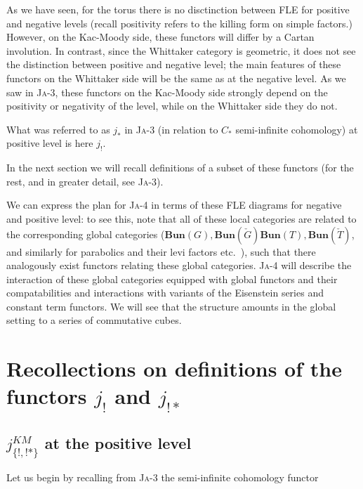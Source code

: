 \documentclass[12pt]{amsart}
\newcommand\Ja[1]{\textsc{Ja}-#1}
\newcommand\Bun{\mathbf{Bun}}
\begin{document}
  As we have seen, for the torus there is no disctinction between FLE for
  positive and negative levels (recall positivity refers to the killing form on
  simple factors.) However, on the Kac-Moody side, these functors will differ by
  a Cartan involution. In contrast, since the Whittaker category is geometric,
  it does not see the distinction between positive and negative level; the main
  features of these functors on the Whittaker side will be the same as at the
  negative level. As we saw in \Ja{3}, these functors on the Kac-Moody
  side strongly depend on the positivity or negativity of the level, while on
  the Whittaker side they do not.\\

  \begin{rmk}
    What was referred to as $j_*$ in \Ja{3} (in relation to $C_*$ semi-infinite
    cohomology) at positive level is here $j_!$.
  \end{rmk}

  In the next section we will recall definitions of a subset of these functors
  (for the rest, and in greater detail, see \Ja{3}).

  \begin{rmk}
    We can express the plan for \Ja{4} in terms of these FLE diagrams for
    negative and positive level: to see this, note that all of these local
    categories are related to the corresponding global categories
    ($\Bun(G),\Bun(\check{G}) \Bun(T),\Bun(\check{T})$, and similarly for
    parabolics and their levi factors etc.\ ), such that there analogously
    exist functors relating these global categories. \Ja{4} will describe the
    interaction of these global categories equipped with global functors and
    their compatabilities and interactions with variants of the Eisenstein
    series and constant term functors. We will see that the structure amounts
    in the global setting to a series of commutative cubes.
  \end{rmk}

\section{Recollections on definitions of the functors $j_!$ and $j_{!*}$}
\subsection{$j_{\{!,!*\}}^{KM}$ at the positive level}
Let us begin by recalling from \Ja{3} the
semi-infinite cohomology functor
\end{document}
